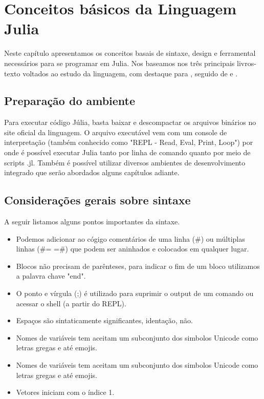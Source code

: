%


\chapter{ Conceitos básicos da Linguagem Julia}

Neste capítulo apresentamos os conceitos basais de sintaxe, design e ferramental necessários para se programar em Julia. Nos baseamos nos três principais livros-texto voltados ao estudo da linguagem, com destaque para \cite{Lobianco2019}, seguido de \cite{Lauwens2019} e \cite{Kwong2020}.

\section{Preparação do ambiente}
Para executar código Júlia, basta baixar e descompactar os arquivos binários no site oficial da linguagem. O arquivo executável vem com um console de interpretação (também conhecido como "REPL - Read, Eval, Print, Loop") por onde é possível executar Julia tanto por linha de comando quanto por meio de scripts .jl. Também é possível utilizar diversos ambientes de desenvolvimento integrado que serão abordados alguns capítulos adiante.

\section{Considerações gerais sobre sintaxe}
A seguir listamos alguns pontos importantes da sintaxe. 
\begin{itemize}
    \item Podemos adicionar ao cógigo comentários de uma linha (\#) ou múltiplas linhas (\#= =\#) que podem ser aninhados e colocados em qualquer lugar.
    \item Blocos não precisam de parênteses, para indicar o fim de um bloco utilizamos a palavra chave "end". 
    \item O ponto e vírgula (;) é utilizado para suprimir o output de um comando ou acessar o shell (a partir do REPL).
    \item Espaços são sintaticamente significantes, identação, não. 
    \item Nomes de variáveis tem aceitam um subconjunto dos simbolos Unicode como letras gregas e até emojis. 
    \item Nomes de variáveis tem aceitam um subconjunto dos simbolos Unicode como letras gregas e até emojis. 
    \item Vetores iniciam com o índice 1. 
\end{itemize}


